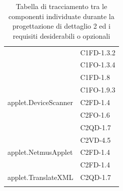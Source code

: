 \begin{footnotesize}
\begin{longtable}[!h]{|l|l|}
& C1FD-1.3.2\\
& C1FO-1.3.4\\
& C1FD-1.8\\
& C1FO-1.9.3\\\hline 
applet.DeviceScanner  &  C2FD-1.4\\
& C2FO-1.6\\
& C2QD-1.7\\
& C2VD-4.5\\\hline
applet.NetmusApplet  &  C2FD-1.4 \\
& C2FD-1.4\\\hline
applet.TranslateXML  &  C2QD-1.7\\\hline
\caption{Tabella di tracciamento tra le componenti individuate durante la
progettazione di dettaglio 2 ed i requisiti desiderabili o opzionali}
\end{longtable}
\end{footnotesize}


